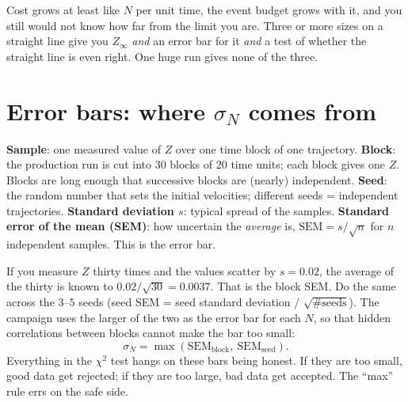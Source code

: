 \documentclass[11pt,a4paper]{article}
\begin{document}
\begin{wrong}
Cost grows at least like $N$ per unit time, the event budget grows with it, and you still would not know how far from the limit you are. Three or more sizes on a straight line give you $Z_\infty$ \emph{and} an error bar for it \emph{and} a test of whether the straight line is even right. One huge run gives none of the three.
\end{wrong}

\section{Error bars: where $\sigma_N$ comes from}

\begin{term}
\textbf{Sample}: one measured value of $Z$ over one time block of one trajectory. \textbf{Block}: the production run is cut into $30$ blocks of $20$ time units; each block gives one $Z$. Blocks are long enough that successive blocks are (nearly) independent. \textbf{Seed}: the random number that sets the initial velocities; different seeds = independent trajectories. \textbf{Standard deviation $s$}: typical spread of the samples. \textbf{Standard error of the mean (SEM)}: how uncertain the \emph{average} is, $\mathrm{SEM} = s/\sqrt{n}$ for $n$ independent samples. This is the error bar.
\end{term}

\begin{eli}
If you measure $Z$ thirty times and the values scatter by $s = 0.02$, the average of the thirty is known to $0.02/\sqrt{30} = 0.0037$. That is the block SEM. Do the same across the $3$--$5$ seeds (seed SEM = seed standard deviation / $\sqrt{\#\text{seeds}}$). The campaign uses the larger of the two as the error bar for each $N$, so that hidden correlations between blocks cannot make the bar too small:
\begin{equation}
\sigma_N = \max\!\left(\mathrm{SEM}_{\mathrm{block}},\ \mathrm{SEM}_{\mathrm{seed}}\right).
\end{equation}
Everything in the $\chi^2$ test hangs on these bars being honest. If they are too small, good data get rejected; if they are too large, bad data get accepted. The ``max'' rule errs on the safe side.
\end{eli}
\end{document}
